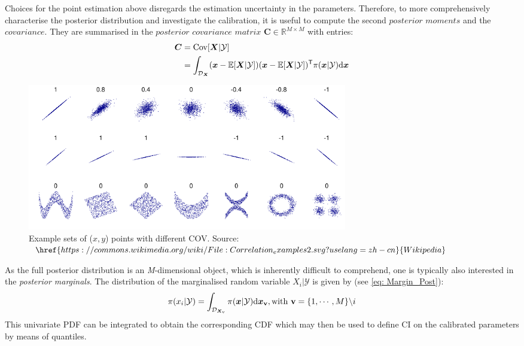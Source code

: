 Choices for the point estimation above disregards the estimation uncertainty in the parameters. Therefore, to more comprehensively characterise the posterior distribution and investigate the calibration, it is useful to compute the second $\textit{posterior moments}$ and the $\textit{covariance}$. They are summarised in the $\textit{posterior covariance matrix}$ $\boldsymbol{C} \in \mathbb{R}^{M \times M}$ with entries:
\begin{equation}
    \label{eq: COV}
    \begin{aligned}
    \boldsymbol{C}  &= {\rm{Cov}}[\boldsymbol{X}|\mathcal{Y}] \\
            &=\int_{\mathcal{D}_{\boldsymbol{X}}} 
            (\boldsymbol{x} - \mathbb{E}[\boldsymbol{X}|\mathcal{Y}])(\boldsymbol{x} - \mathbb{E}[\boldsymbol{X}|\mathcal{Y}])^{\mathsf{T}} \pi(\boldsymbol{x}|\mathcal{Y}) {\rm{d}} \boldsymbol{x} 
    \end{aligned}  
\end{equation}
\begin{figure}[htbp]
    \centering
    \includegraphics[width = 140mm]{Figures/figure-COV.pdf}
    \caption{Example sets of ($x,y$) points with different COV. Source: $\href{https://commons.wikimedia.org/wiki/File:Correlation_examples2.svg?uselang=zh-cn}{Wikipedia}$}
    \label{fig: COV}
\end{figure}
As  the full posterior distribution is an \textit{M}-dimensional object, which is inherently difficult to comprehend, one is typically also interested in the \textit{posterior marginals}. The distribution of the marginalised random variable $X_{i}|\mathcal{Y}$ is given by (see \cref{eq: Margin_Post}):
\begin{equation}
    \label{eq: Margin_Post}
    \pi(x_{i}|\mathcal{Y}) = \int_{\mathcal{D}_{\boldsymbol{X}_{\rm{\boldsymbol{v}}}}}
          \pi(\boldsymbol{x}|\mathcal{Y}){\rm{d}} \boldsymbol{x_{\rm{\boldsymbol{v}}}}, {\rm{with}} \ \boldsymbol{\mathrm{v}} = \{1,\cdots,M\} \backslash i  
\end{equation}
This univariate \acrshort{PDF} can be integrated to obtain the corresponding \acrfull{CDF} which may then be used to define \acrfull{CI} on the calibrated parameters by means of quantiles.

